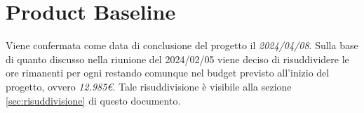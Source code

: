\section{Product Baseline}
Viene confermata come data di conclusione del progetto il \textit{2024/04/08}. Sulla base di quanto discusso nella riunione del 2024/02/05 viene deciso di risuddividere le ore rimanenti per ogni  restando comunque nel budget previsto all'inizio del progetto, ovvero \textit{12.985€}. Tale risuddivisione è visibile alla sezione \ref{sec:risuddivisione} di questo documento.
